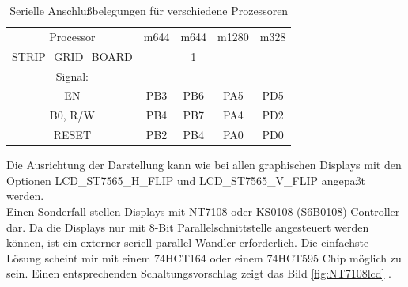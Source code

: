 \begin{table}[H]
  \begin{center}
    \begin{tabular}{| c || c | c | c | c |}
    \hline
 Processor  & m644  & m644 & m1280  & m328 \\
STRIP\_GRID\_BOARD &       &   1   &        &     \\
    \hline
    \hline
Signal:     &       &       &        &         \\
  EN        &  PB3  & PB6   &  PA5   & PD5     \\
    \hline
  B0, R/W   &  PB4  & PB7   &  PA4   & PD2      \\
    \hline
  RESET     &  PB2  & PB4   &  PA0   & PD0      \\
    \hline
    \end{tabular}
  \end{center}
  \caption{Serielle Anschlußbelegungen für verschiedene Prozessoren}
  \label{tab:ser-processor}
\end{table}

Die Ausrichtung der Darstellung kann wie bei allen graphischen Displays  mit den Optionen
LCD\_ST7565\-\_H\_FLIP und LCD\_ST7565\-\_V\_FLIP angepaßt werden. \\

Einen Sonderfall stellen Displays mit NT7108 oder KS0108 (S6B0108) Controller dar. Da die Displays nur mit 8-Bit Parallelschnittstelle
angesteuert werden können, ist ein externer seriell-parallel Wandler erforderlich.
Die einfachste Lösung scheint mir mit einem 74HCT164 oder einem 74HCT595 Chip möglich zu sein.
Einen entsprechenden Schaltungsvorschlag zeigt das Bild \ref{fig:NT7108lcd} .

